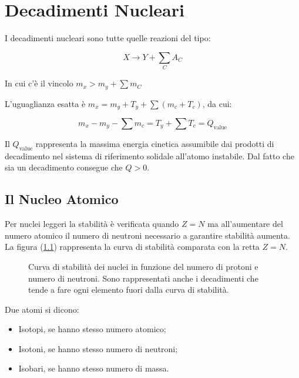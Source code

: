 
\chapter{Decadimenti Nucleari}

I decadimenti nucleari sono tutte quelle reazioni del tipo:

\begin{equation}
X \longrightarrow Y + \sum_C A_C
\end{equation}

In cui c'è il vincolo $m_x>m_y + \sum m_C$

L'uguaglianza esatta è $m_x=m_y+T_y+\sum (m_c+T_c)$, da cui:

\begin{equation}
m_x-m_y-\sum m_c = T_y + \sum T_c = Q_{\text{value}}
\end{equation}

Il $Q_{\text{value}}$ rappresenta la massima energia cinetica assumibile dai prodotti di decadimento nel sistema di riferimento solidale all'atomo instabile. Dal fatto che sia un decadimento consegue che $Q>0$. 


\section{Il Nucleo Atomico}

Per nuclei leggeri la stabilità è verificata quando $Z=N$ ma all'aumentare del numero atomico il numero di neutroni necessario a garantire stabilità aumenta. 
La figura (\ref{curvadistabilita}) rappresenta la curva di stabilità comparata con la retta $Z=N$.\\
\begin{figure} []
\centering
		\caption{Curva di stabilità dei nuclei in funzione del numero di protoni e numero di neutroni. Sono rappresentati anche i decadimenti che tende a fare ogni elemento fuori dalla curva di stabilità.}
         \label{curvadistabilita}
\end{figure}

Due atomi si dicono:

\begin{itemize}
\item Isotopi, se hanno stesso numero atomico;
\item Isotoni, se hanno stesso numero di neutroni;
\item Isobari, se hanno stesso numero di massa.
\end{itemize}

